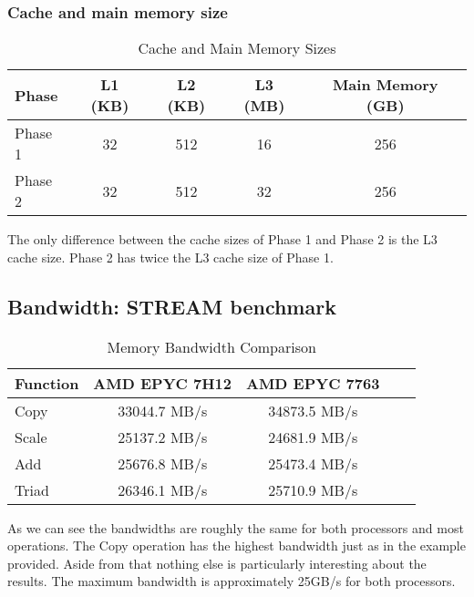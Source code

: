 \documentclass[unicode,11pt,a4paper,oneside,numbers=endperiod,openany]{scrartcl}
\begin{document}
\subsubsection{Cache and main memory size}

\begin{table}[ht]
\centering
\caption{Cache and Main Memory Sizes}
\begin{tabular}{|l|c|c|c|c|}
\hline
\textbf{Phase} & \textbf{L1 (KB)} & \textbf{L2 (KB)} & \textbf{L3 (MB)} & \textbf{Main Memory (GB)} \\ \hline
Phase 1        & 32               & 512              & 16               & 256                      \\ \hline
Phase 2        & 32               & 512              & 32               & 256                      \\ \hline
\end{tabular}
\end{table}

The only difference between the cache sizes of Phase 1 and Phase 2 is the L3 cache size. 
Phase 2 has twice the L3 cache size of Phase 1.

\subsection{Bandwidth: STREAM benchmark}

\begin{table}[ht]
\centering
\caption{Memory Bandwidth Comparison}
\begin{tabular}{|l|c|c|c|c|}
\hline
\textbf{Function} & \textbf{AMD EPYC 7H12} & \textbf{AMD EPYC 7763} \\ \hline
Copy              & 33044.7 MB/s           & 34873.5 MB/s           \\ \hline
Scale             & 25137.2 MB/s           & 24681.9 MB/s           \\ \hline
Add               & 25676.8 MB/s           & 25473.4 MB/s           \\ \hline
Triad             & 26346.1 MB/s           & 25710.9 MB/s           \\ \hline
\end{tabular}
\end{table}

As we can see the bandwidths are roughly the same for both processors and most operations.
The Copy operation has the highest bandwidth just as in the example provided. 
Aside from that nothing else is particularly interesting about the results.
The maximum bandwidth is approximately 25GB/s for both processors.
\end{document}
